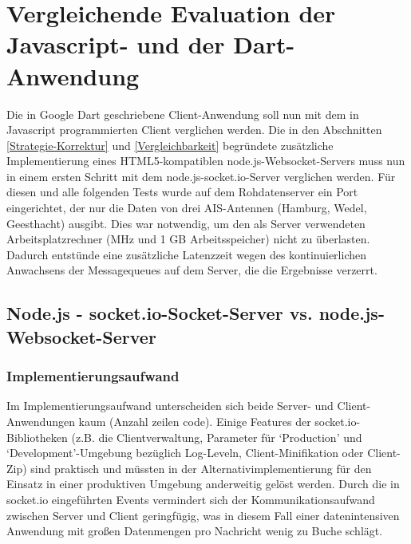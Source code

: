 \section{Vergleichende Evaluation der Javascript- und der Dart-Anwendung}
Die in Google Dart geschriebene Client-Anwendung soll nun mit dem in Javascript programmierten Client verglichen werden. Die in den Abschnitten  \ref{Strategie-Korrektur} und \ref{Vergleichbarkeit} begründete zusätzliche Implementierung eines HTML5-kompatiblen node.js-Websocket-Servers muss nun in einem ersten Schritt mit dem node.js-socket.io-Server verglichen werden. Für diesen und alle folgenden Tests wurde auf dem Rohdatenserver ein Port eingerichtet, der nur die Daten von drei AIS-Antennen (Hamburg, Wedel, Geesthacht) ausgibt. Dies war notwendig, um den als Server verwendeten Arbeitsplatzrechner (MHz und 1 GB Arbeitsspeicher) nicht zu überlasten. Dadurch entstünde eine zusätzliche Latenzzeit wegen des kontinuierlichen Anwachsens der Messagequeues auf dem Server, die die Ergebnisse verzerrt.
\subsection{Node.js - socket.io-Socket-Server vs. node.js-Websocket-Server}\label{socket.io- vs html5-Server}
\subsubsection{Implementierungsaufwand}
Im Implementierungsaufwand unterscheiden sich beide Server- und Client-Anwendungen kaum (Anzahl zeilen code).  Einige Features der socket.io-Bibliotheken (z.B. die Clientverwaltung, Parameter für ‘Production’ und ‘Development’-Umgebung bezüglich Log-Leveln, Client-Minifikation oder Client-Zip) sind praktisch und müssten in der Alternativimplementierung für den Einsatz in einer produktiven Umgebung anderweitig gelöst werden. Durch die in socket.io eingeführten Events vermindert sich der Kommunikationsaufwand zwischen Server und Client geringfügig, was in diesem Fall einer datenintensiven Anwendung mit großen Datenmengen pro Nachricht wenig zu Buche schlägt.
